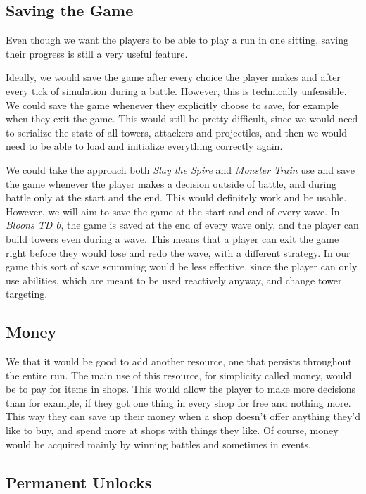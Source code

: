 \begin{notindemo}
    \subsection{Saving the Game}

    Even though we want the players to be able to play a run in one sitting, saving their progress is still a very useful feature.

    Ideally, we would save the game after every choice the player makes and after every tick of simulation during a battle.
    However, this is technically unfeasible.
    We could save the game whenever they explicitly choose to save, for example when they exit the game.
    This would still be pretty difficult, since we would need to serialize the state of all towers, attackers and projectiles, and then we would need to be able to load and initialize everything correctly again.

    We could take the approach both \emph{Slay the Spire} and \emph{Monster Train} use and save the game whenever the player makes a decision outside of battle, and during battle only at the start and the end.
    This would definitely work and be usable.
    However, we will aim to save the game at the start and end of every wave.
    In \emph{Bloons TD 6}, the game is saved at the end of every wave only, and the player can build towers even during a wave.
    This means that a player can exit the game right before they would lose and redo the wave, with a different strategy.
    In our game this sort of save scumming would be less effective, since the player can only use abilities, which are meant to be used reactively anyway, and change tower targeting.

    \subsection{Money}

    We that it would be good to add another resource, one that persists throughout the entire run.
    The main use of this resource, for simplicity called money, would be to pay for items in shops.
    This would allow the player to make more decisions than for example, if they got one thing in every shop for free and nothing more.
    This way they can save up their money when a shop doesn't offer anything they'd like to buy, and spend more at shops with things they like.
    Of course, money would be acquired mainly by winning battles and sometimes in events.

    \subsection{Permanent Unlocks}


\end{notindemo}
